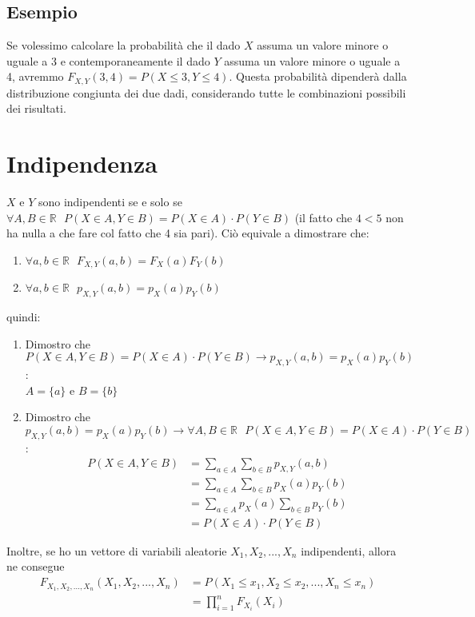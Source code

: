 \documentclass[11pt]{report}
\begin{document}
\subsection{Esempio}
Se volessimo calcolare la probabilità che il dado $X$ assuma un valore minore o uguale a 3 e contemporaneamente il dado $Y$ assuma un valore minore o uguale a 4, avremmo $F_{X,Y}(3,4) = P(X \leq 3, Y \leq 4)$. Questa probabilità dipenderà dalla distribuzione congiunta dei due dadi, considerando tutte le combinazioni possibili dei risultati.

\section{Indipendenza}
$X$ e $Y$ sono indipendenti se e solo se $\forall A,B \in \mathbb{R}\ \ \ P(X \in A, Y \in B) = P(X \in A) \cdot P(Y \in B)$ (il fatto che $4 < 5$ non ha nulla a che fare col fatto che 4 sia pari). Ciò equivale a dimostrare che:
\begin{enumerate}
	\item $\forall a,b \in \mathbb{R}\ \ \ F_{X,Y}(a,b) = F_X(a)F_Y(b)$
	\item $\forall a,b \in \mathbb{R}\ \ \ p_{X,Y}(a,b) = p_X(a)p_Y(b)$
\end{enumerate}
quindi:
\begin{enumerate}
	\item Dimostro che $P(X \in A, Y \in B) = P(X \in A) \cdot P(Y \in B) \rightarrow p_{X,Y}(a,b) = p_X(a)p_Y(b)$:\\
	$A = \{a\}$ e $B = \{b\}$
	\item Dimostro che $p_{X,Y}(a,b) = p_X(a)p_Y(b) \rightarrow \forall A,B \in \mathbb{R}\ \ \ P(X \in A, Y \in B) = P(X \in A) \cdot P(Y \in B)$:
    \begin{equation}
        \begin{split}
            P(X \in A, Y \in B) & = \sum_{a \in A}\sum_{b \in B}p_{X,Y}(a,b)\\
            & = \sum_{a \in A}\sum_{b \in B}p_X(a)p_Y(b)\\
            & = \sum_{a \in A}p_X(a)\sum_{b \in B}p_Y(b)\\
            & = P(X \in A) \cdot P(Y \in B)
        \end{split}
    \end{equation}
\end{enumerate}
Inoltre, se ho un vettore di variabili aleatorie $X_1, X_2,...,X_n$ indipendenti, allora ne consegue
\begin{equation}
    \begin{split}
        F_{X_1,X_2,...,X_n}(X_1, X_2,...,X_n) & = P(X_1 \leq x_1, X_2 \leq x_2,..., X_n \leq x_n)\\
        & = \prod_{i=1}^{n}F_{X_i}(X_i)
    \end{split}
\end{equation}
\end{document}

